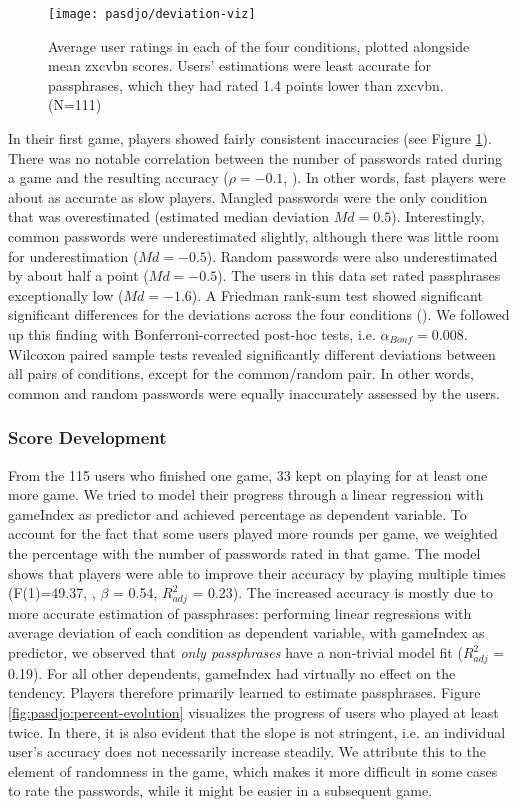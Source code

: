 \begin{figure}[tbp]
	\centering
	\texttt{[image: pasdjo/deviation-viz]}
	\caption{\label{fig:pasdjo:deviation-viz} Average user ratings in each of the four conditions, plotted alongside mean zxcvbn scores. Users' estimations were least accurate for passphrases, which they had rated 1.4 points lower than zxcvbn. (N=111) }
\end{figure}

In their first game, players showed fairly consistent inaccuracies (see Figure \ref{fig:pasdjo:deviation-viz}).
There was no notable correlation between the number of passwords rated during a game and the resulting accuracy ($\rho=-0.1$, ). In other words, fast players were about as accurate as slow players. Mangled passwords were the only condition that was overestimated (estimated median deviation $Md=0.5$). Interestingly, common passwords were underestimated slightly, although there was little room for underestimation ($Md=-0.5$). Random passwords were also underestimated by about half a point ($Md=-0.5$). The users in this data set rated passphrases exceptionally low ($Md = -1.6$). A Friedman rank-sum test showed significant significant differences for the deviations across the four conditions (). We followed up this finding with Bonferroni-corrected post-hoc tests, i.e. $\alpha_{Bonf}=0.008$. Wilcoxon paired sample tests revealed significantly different deviations between all pairs of conditions, except for the common/random pair. In other words, common and random passwords were equally inaccurately assessed by the users. 

\subsubsection{Score Development}
From the 115 users who finished one game, 33 kept on playing for at least one more game. We tried to model their progress through a linear regression with gameIndex as predictor and achieved percentage as dependent variable. To account for the fact that some users played more rounds per game, we weighted the percentage with the number of passwords rated in that game. The model shows that players were able to improve their accuracy by playing multiple times (F(1)=49.37, , $\beta$ = 0.54, $R^2_{adj}$ = 0.23). The increased accuracy is mostly due to more accurate estimation of passphrases: performing linear regressions with average deviation of each condition as dependent variable, with gameIndex as predictor, we observed that \textit{only passphrases} have a non-trivial model fit ($R^2_{adj}$ = 0.19). For all other dependents, gameIndex had virtually no effect on the tendency. Players therefore primarily learned to estimate passphrases. Figure \ref{fig:pasdjo:percent-evolution} visualizes the progress of users who played at least twice. In there, it is also evident that the slope is not stringent, i.e. an individual user's accuracy does not necessarily increase steadily. We attribute this to the element of randomness in the game, which makes it more difficult in some cases to rate the passwords, while it might be easier in a subsequent game. 


